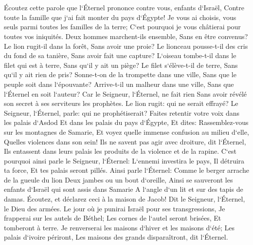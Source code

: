 \chapter{}

\verse Écoutez cette parole que l`Éternel prononce contre vous, enfants d`Israël, Contre toute la famille que j`ai fait monter du pays d`Égypte! 
\verse Je vous ai choisis, vous seuls parmi toutes les familles de la terre; C`est pourquoi je vous châtierai pour toutes vos iniquités. 
\verse Deux hommes marchent-ils ensemble, Sans en être convenus? 
\verse Le lion rugit-il dans la forêt, Sans avoir une proie? Le lionceau pousse-t-il des cris du fond de sa tanière, Sans avoir fait une capture? 
\verse L`oiseau tombe-t-il dans le filet qui est à terre, Sans qu`il y ait un piège? Le filet s`élève-t-il de terre, Sans qu`il y ait rien de pris? 
\verse Sonne-t-on de la trompette dans une ville, Sans que le peuple soit dans l`épouvante? Arrive-t-il un malheur dans une ville, Sans que l`Éternel en soit l`auteur? 
\verse Car le Seigneur, l`Éternel, ne fait rien Sans avoir révélé son secret à ses serviteurs les prophètes. 
\verse Le lion rugit: qui ne serait effrayé? Le Seigneur, l`Éternel, parle: qui ne prophétiserait? 
\verse Faites retentir votre voix dans les palais d`Asdod Et dans les palais du pays d`Égypte, Et dites: Rassemblez-vous sur les montagnes de Samarie, Et voyez quelle immense confusion au milieu d`elle, Quelles violences dans son sein! 
\verse Ils ne savent pas agir avec droiture, dit l`Éternel, Ils entassent dans leurs palais les produits de la violence et de la rapine. 
\verse C`est pourquoi ainsi parle le Seigneur, l`Éternel: L`ennemi investira le pays, Il détruira ta force, Et tes palais seront pillés. 
\verse Ainsi parle l`Éternel: Comme le berger arrache de la gueule du lion Deux jambes ou un bout d`oreille, Ainsi se sauveront les enfants d`Israël qui sont assis dans Samarie A l`angle d`un lit et sur des tapis de damas. 
\verse Écoutez, et déclarez ceci à la maison de Jacob! Dit le Seigneur, l`Éternel, le Dieu des armées. 
\verse Le jour où je punirai Israël pour ses transgressions, Je frapperai sur les autels de Béthel; Les cornes de l`autel seront brisées, Et tomberont à terre. 
\verse Je renverserai les maisons d`hiver et les maisons d`été; Les palais d`ivoire périront, Les maisons des grands disparaîtront, dit l`Éternel. 

\chapter{}


